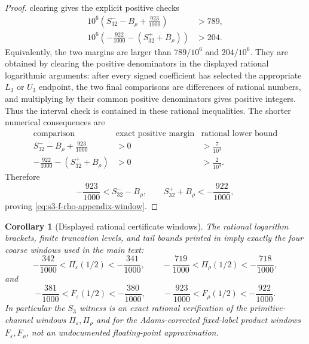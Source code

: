 \documentclass[11pt,a4paper]{amsart}
\theoremstyle{plain}
\newtheorem{corollary}[theorem]{Corollary}
\theoremstyle{definition}
\theoremstyle{remark}
\begin{document}
\begin{proof}
  clearing gives the explicit positive checks
  \[
  \begin{aligned}
    10^6\left(S_{32}^- -B_\rho +\frac{923}{1000}\right) &> 789,\\
    10^6\left(-\frac{922}{1000}-(S_{32}^+ +B_\rho)\right) &> 204.
  \end{aligned}
  \]
  Equivalently, the two margins are larger than \(789/10^6\) and
  \(204/10^6\). They are obtained by clearing the positive denominators in
  the displayed rational logarithmic arguments: after every signed coefficient
  has selected the appropriate \(L_3\) or \(U_3\) endpoint, the two final
  comparisons are differences of rational numbers, and multiplying by their
  common positive denominators gives positive integers.  Thus the interval
  check is contained in these rational inequalities. The shorter numerical
  consequences are
  \[
  \begin{array}{c|c|c}
    \text{comparison} & \text{exact positive margin} &
      \text{rational lower bound}\\
    \hline
    S_{32}^- -B_\rho +\frac{923}{1000} & >0 & >\frac{7}{10^4}\\
    -\frac{922}{1000}-(S_{32}^+ +B_\rho) & >0 & >\frac{2}{10^4}.
  \end{array}
  \]
  Therefore
  \[
    -\frac{923}{1000}<S_{32}^- -B_\rho,
    \qquad
    S_{32}^+ +B_\rho<-\frac{922}{1000},
  \]
  proving \eqref{eq:s3-f-rho-appendix-window}.
\end{proof}

\begin{corollary}[Displayed rational certificate windows]
  \label{cor:s3-displayed-rational-certificate-windows}
  The rational logarithm brackets, finite truncation levels, and tail bounds
  printed in 
  imply exactly the four coarse windows used in the main text:
  \[
    -\frac{342}{1000}<\Pi_\varepsilon(1/2)<-\frac{341}{1000},
    \qquad
    -\frac{719}{1000}<\Pi_\rho(1/2)<-\frac{718}{1000},
  \]
  and
  \[
    -\frac{381}{1000}<F_\varepsilon(1/2)<-\frac{380}{1000},
    \qquad
    -\frac{923}{1000}<F_\rho(1/2)<-\frac{922}{1000}.
  \]
  In particular the \(S_3\) witness is an exact rational verification of
  the primitive-channel windows \(\Pi_\varepsilon,\Pi_\rho\) and for the
  Adams-corrected fixed-label product windows \(F_\varepsilon,F_\rho\), not an
  undocumented floating-point approximation.
\end{corollary}
\end{document}
